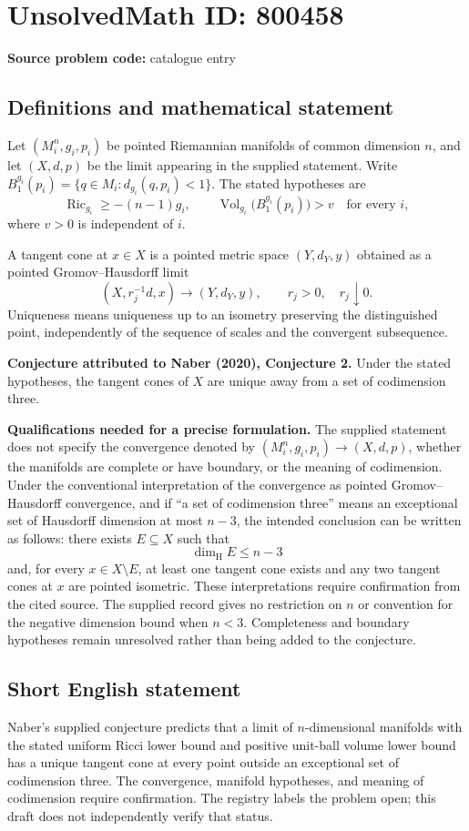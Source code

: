 \documentclass[11pt]{article}
\begin{document}
\section*{UnsolvedMath ID: 800458}
\textbf{Source problem code:} catalogue entry
\subsection{Definitions and mathematical statement}
Let \((M_i^n,g_i,p_i)\) be pointed Riemannian manifolds of common dimension \(n\), and let \((X,d,p)\) be the limit appearing in the supplied statement. Write \(B_1^{g_i}(p_i)=\{q\in M_i:d_{g_i}(q,p_i)<1\}\). The stated hypotheses are
\[
\operatorname{Ric}_{g_i}\geq -(n-1)g_i,
\qquad
\operatorname{Vol}_{g_i}\bigl(B_1^{g_i}(p_i)\bigr)>v
\quad\text{for every }i,
\]
where \(v>0\) is independent of \(i\).

A tangent cone at \(x\in X\) is a pointed metric space \((Y,d_Y,y)\) obtained as a pointed Gromov--Hausdorff limit
\[
(X,r_j^{-1}d,x)\longrightarrow (Y,d_Y,y),
\qquad r_j>0,\quad r_j\downarrow0.
\]
Uniqueness means uniqueness up to an isometry preserving the distinguished point, independently of the sequence of scales and the convergent subsequence.

\textbf{Conjecture attributed to Naber (2020), Conjecture 2.} Under the stated hypotheses, the tangent cones of \(X\) are unique away from a set of codimension three.

\textbf{Qualifications needed for a precise formulation.} The supplied statement does not specify the convergence denoted by \((M_i^n,g_i,p_i)\to(X,d,p)\), whether the manifolds are complete or have boundary, or the meaning of codimension. Under the conventional interpretation of the convergence as pointed Gromov--Hausdorff convergence, and if ``a set of codimension three'' means an exceptional set of Hausdorff dimension at most \(n-3\), the intended conclusion can be written as follows: there exists \(E\subseteq X\) such that
\[
\dim_{\mathrm H}E\leq n-3
\]
and, for every \(x\in X\setminus E\), at least one tangent cone exists and any two tangent cones at \(x\) are pointed isometric. These interpretations require confirmation from the cited source. The supplied record gives no restriction on \(n\) or convention for the negative dimension bound when \(n<3\). Completeness and boundary hypotheses remain unresolved rather than being added to the conjecture.
\subsection{Short English statement}
Naber's supplied conjecture predicts that a limit of \(n\)-dimensional manifolds with the stated uniform Ricci lower bound and positive unit-ball volume lower bound has a unique tangent cone at every point outside an exceptional set of codimension three. The convergence, manifold hypotheses, and meaning of codimension require confirmation. The registry labels the problem open; this draft does not independently verify that status.
\end{document}
